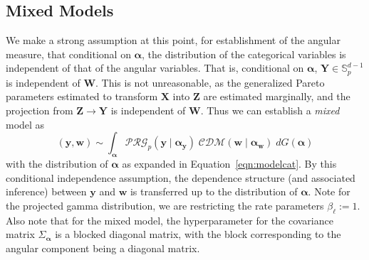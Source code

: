 \subsection{Mixed Models}
We make a strong assumption at this point, for establishment of the angular 
  measure, that conditional on $\bm{\alpha}$, the distribution of the categorical 
  variables is independent of that of the angular variables.  That is, conditional
  on $\bm{\alpha}$, $\bm{Y} \in {\mathbb S}_{p}^{d-1}$ is independent of $\bm{W}$.  
  This is not unreasonable, as the generalized Pareto parameters estimated to transform 
  $\bm{X}$ into $\bm{Z}$ are estimated marginally, and the projection from
  $\bm{Z}\to\bm{Y}$ is independent of $\bm{W}$.  Thus we can establish a 
  \emph{mixed} model as
  \begin{equation}
    \label{model:mixed}
    (\bm{y},\bm{w})\sim \int_{\bm{\alpha}}\mathcal{PRG}_{p}(\bm{y}\mid\bm{\alpha}_{\bm{y}})
    \;\mathcal{CDM}(\bm{w}\mid\bm{\alpha}_{\bm{w}})\;dG(\bm{\alpha})
  \end{equation}
  with the distribution of $\bm{\alpha}$ as expanded in Equation~\ref{eqn:modelcat}.
    By this conditional independence assumption, the dependence structure 
    (and associated inference) between  $\bm{y}$ and $\bm{w}$ is transferred up 
    to the distribution of $\bm{\alpha}$.  Note for the projected gamma distribution, 
    we are restricting the rate parameters $\beta_{\ell} := 1$.  Also note that for the 
    mixed model, the hyperparameter for the covariance matrix $\Sigma_{\bm{\alpha}}$
    is a blocked diagonal matrix, with the block corresponding to the angular component
    being a diagonal matrix.

